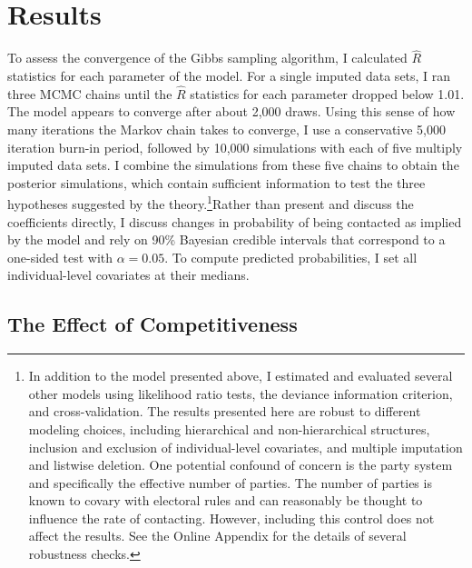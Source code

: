 \documentclass[12pt]{article}
\begin{document}
\section*{Results}

To assess the convergence of the Gibbs sampling algorithm, I calculated $\hat{R}$ statistics \citep{GelmanRubin1992} for each parameter of the model. For a single imputed data sets, I ran three MCMC chains until the $\hat{R}$ statistics for each parameter dropped below 1.01. The model appears to converge after about 2,000 draws. Using this sense of how many iterations  the Markov chain takes to converge, I use a conservative 5,000 iteration burn-in period, followed by 10,000 simulations with each of five multiply imputed data sets. I combine the simulations from these five chains to obtain the posterior simulations, which contain sufficient information to test the three hypotheses suggested by the theory.\footnote{\label{fn:robust}In addition to the model presented above, I estimated and evaluated several other models using likelihood ratio tests, the deviance information criterion, and cross-validation. The results presented here are robust to different modeling choices, including hierarchical and non-hierarchical structures, inclusion and exclusion of individual-level covariates, and multiple imputation and listwise deletion. One potential confound of concern is the party system and specifically the effective number of parties. The number of parties is known to covary with electoral rules and can reasonably be thought to influence the rate of contacting. However, including this control does not affect the results. See the Online Appendix for the details of several robustness checks.}Rather than present and discuss the coefficients directly, I discuss changes in probability of being contacted as implied by the model \citep{KingTomzWhittenburg2000, BerryDeMerittEsarey2010} and rely on 90\% Bayesian credible intervals that correspond to a one-sided test with $\alpha=0.05$. To compute predicted probabilities, I set all individual-level covariates at their medians.

\subsection*{The Effect of Competitiveness}
\end{document}
